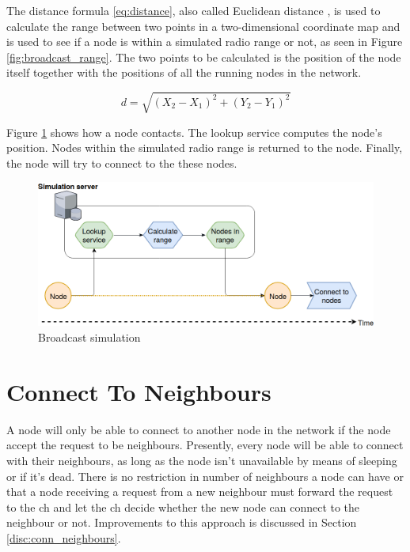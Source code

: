 \documentclass[USenglish]{uit-thesis}
\begin{document}
The distance formula \ref{eq:distance}, also called Euclidean distance \cite{euclidean}, is used to calculate the range between two points in a two-dimensional coordinate map and is used to see if a node is within a simulated radio range or not, as seen in Figure \ref{fig:broadcast_range}. The two points to be calculated is the position of the node itself together with the positions of all the running nodes in the network.

\begin{equation} \label{eq:distance}
d = \sqrt{(X_{2} - X_{1})^{2}+(Y_{2} - Y_{1})^{2}}
\end{equation}


Figure \ref{fig:broadcast_simulation} shows how a node contacts. The lookup service computes the node's position. Nodes within the simulated radio range is returned to the node. Finally, the node will try to connect to the these nodes.

\begin{figure} [!b]
\centering
\includegraphics[width=\textwidth]{broadcast_simulation_kopi.png}
\caption{Broadcast simulation}
\label{fig:broadcast_simulation}
\end{figure}

\section{Connect To Neighbours}
A node will only be able to connect to another node in the network if the node accept the request to be neighbours. Presently, every node will be able to connect with their neighbours, as long as the node isn't unavailable by means of sleeping or if it's dead. There is no restriction in number of neighbours a node can have or that a node receiving a request from a new neighbour must forward the request to the \gls{ch} and let the \gls{ch} decide whether the new node can connect to the neighbour or not. Improvements to this approach is discussed in Section \ref{disc:conn_neighbours}.
\end{document}
